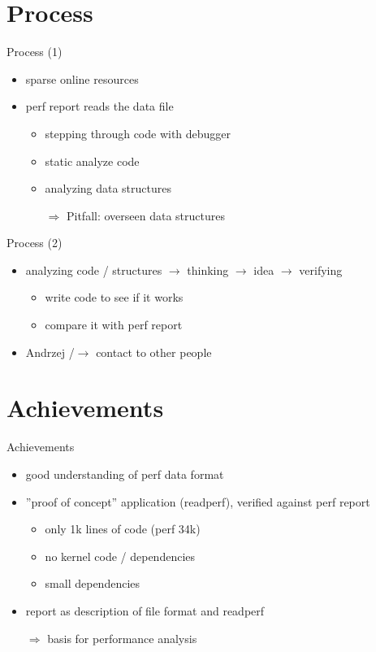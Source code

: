 \section{Process}
\begin{frame}{Process (1)}
\begin{itemize}
  \item sparse online resources
  \item perf report reads the data file
\pause
  \begin{itemize}
    \item stepping through code with debugger
    \item static analyze code
    \item analyzing data structures
\pause
    \item[$\Rightarrow$] Pitfall: overseen data structures
  \end{itemize}
\end{itemize}
\begin{center}
  
\end{center}
\end{frame}

\begin{frame}{Process (2)}
\begin{itemize}
  \item analyzing code / structures $\rightarrow$ thinking $\rightarrow$ idea $\rightarrow$ verifying
  \begin{itemize}
    \item write code to see if it works
    \item compare it with perf report
  \end{itemize}
\pause
  \item Andrzej /$\rightarrow$ contact to other people
\end{itemize}
\end{frame}

\section{Achievements}
\begin{frame}{Achievements}
\begin{itemize}
  \item good understanding of perf data format
\pause
  \item ''proof of concept'' application (readperf), verified against perf report
  \begin{itemize}
    \item only 1k lines of code (perf 34k)
    \item no kernel code / dependencies
    \item small dependencies
  \end{itemize}
\pause
  \item report as description of file format and readperf
\pause
  \item[$\Rightarrow$] basis for performance analysis
\end{itemize}
\end{frame}

